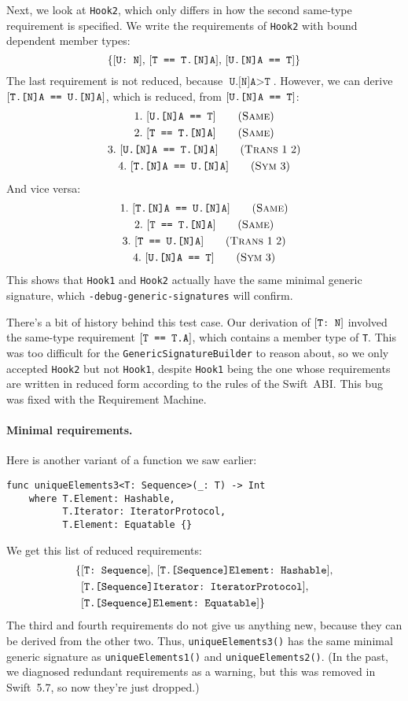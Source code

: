 \documentclass[../generics]{subfiles}
\begin{document}
Next, we look at \texttt{Hook2}, which only differs in how the second same-type requirement is specified. We write the requirements of \texttt{Hook2} with bound dependent member types:
\[\{[\texttt{U:~N}],\,[\texttt{T == T.[N]A}],\,[\texttt{U.[N]A == T}]\}\]
The last requirement is not reduced, because $\texttt{U.[N]A}>\texttt{T}$. However, we can derive $[\texttt{T.[N]A == U.[N]A}]$, which is reduced, from $[\texttt{U.[N]A == T}]$:
\begin{gather*}
\SameStep{U.[N]A}{T}{1}\\
\SameStep{T}{T.[N]A}{2}\\
\TransStep{1}{2}{U.[N]A}{T.[N]A}{3}\\
\SymStep{3}{T.[N]A}{U.[N]A}{4}
\end{gather*}
And vice versa:
\begin{gather*}
\SameStep{T.[N]A}{U.[N]A}{1}\\
\SameStep{T}{T.[N]A}{2}\\
\TransStep{1}{2}{T}{U.[N]A}{3}\\
\SymStep{3}{U.[N]A}{T}{4}
\end{gather*}
This shows that \texttt{Hook1} and \texttt{Hook2} actually have the same minimal generic signature, which \texttt{-debug-generic-signatures} will confirm.

There's a bit of history behind this test case. Our derivation of $[\texttt{T:~N}]$ involved the same-type requirement $[\texttt{T == T.A}]$, which contains a member type of \texttt{T}. This was too difficult for the \texttt{GenericSignatureBuilder} to reason about, so we only accepted \texttt{Hook2} but not \texttt{Hook1}, despite \texttt{Hook1} being the one whose requirements are written in reduced form according to the rules of the Swift~ABI. This bug was fixed with the Requirement Machine.

\paragraph{Minimal requirements.} Here is another variant of a function we saw earlier:
\begin{Verbatim}
func uniqueElements3<T: Sequence>(_: T) -> Int
    where T.Element: Hashable,
          T.Iterator: IteratorProtocol,
          T.Element: Equatable {}
\end{Verbatim}
We get this list of reduced requirements:
\begin{align*}
\{&[\texttt{T:~Sequence}],\,[\texttt{T.[Sequence]Element:~Hashable}],\\
&[\texttt{T.[Sequence]Iterator:~IteratorProtocol}],\\
&[\texttt{T.[Sequence]Element:~Equatable}]\}
\end{align*}
The third and fourth requirements do not give us anything new, because they can be derived from the other two. Thus, \texttt{uniqueElements3()} has the same minimal generic signature as \texttt{uniqueElements1()} and \texttt{uniqueElements2()}. (In the past, we diagnosed redundant requirements as a warning, but this was removed in Swift~5.7, so now they're just dropped.)
\end{document}
